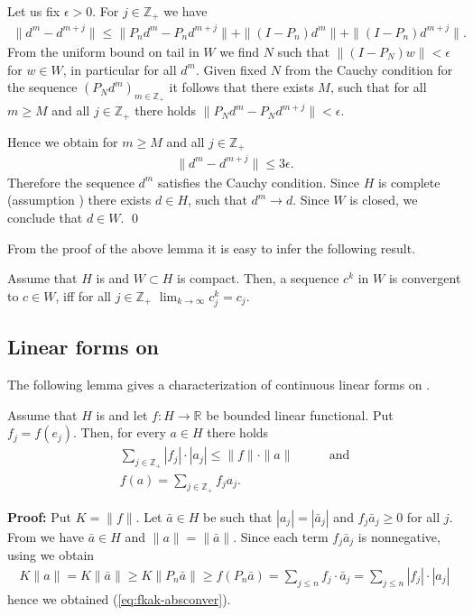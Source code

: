 Let us fix $\epsilon >0$. For $j\in{\mathbb Z_+}$ we have
\begin{eqnarray*}
  \|d^m - d^{m+j}\| \leq \|P_n d^m - P_n d^{m+j}\| + \|(I-P_n) d^m\| + \|(I-P_n) d^{m+j}\|.
\end{eqnarray*}
From the uniform bound on tail in $W$ we find $N$ such that $\|(I-P_N)w\| < \epsilon$ for $w \in W$, in particular for all $d^m$. Given fixed $N$ from the Cauchy condition for the sequence $(P_N d^m)_{m\in\mathbb Z_+}$ it follows that there exists $M$, such that for all $m \geq M$ and all $j \in \mathbb{Z}_+$ there holds $\|P_N d^m - P_N d^{m+j}\| < \epsilon$.

Hence we obtain for $m \geq M$ and all $j \in \mathbb{Z}_+$
 \begin{eqnarray*}
  \|d^m - d^{m+j}\| \leq 3 \epsilon.
\end{eqnarray*}
Therefore the sequence $d^m$ satisfies the Cauchy condition. Since $H$ is complete (assumption ) there exists $d \in H$, such that $d^m \to d$. Since $W$
is closed, we conclude that $d \in W$.
\qed

From the proof of the above lemma it is  easy to infer the following result.
\begin{lemma}
\label{lem:convW-gss}
  Assume that $H$ is \gss  and $W \subset H$ is compact. Then, a sequence $c^k$ in $W$ is convergent to $c \in W$, iff for all $j\in \mathbb{Z}_+$ $\lim_{k \to \infty} c^k_j=c_j$.
\end{lemma}

\subsection{Linear forms on \gss}

The following lemma gives a characterization of continuous linear forms on \gss.
\begin{lemma}
\label{lem:formOnH}
Assume that $H$ is \gss and let $f:H \to \mathbb{R}$ be bounded linear functional. Put $f_j=f(e_j)$. Then, for every $a \in H$ there holds
\begin{eqnarray}
   \sum_{j \in \mathbb{Z}_+} |f_j| \cdot  |a_j| \leq \|f\| \cdot \|a\|  \label{eq:fkak-absconver}&\qquad \text{and}\\
   f(a)=\sum_{j \in \mathbb{Z}_+} f_j a_j.   \label{eq:funcLinonH}
\end{eqnarray}
\end{lemma}
\textbf{Proof:} Put $K=\|f\|$.
   Let $\bar{a} \in H$ be such that $|a_j|=|\bar{a}_j|$ and $f_j \bar{a}_j \geq 0$ for all $j$. From  we have $\bar{a} \in H$ and $\|a\|=\|\bar{a}\|$.  Since each term $f_j \bar{a}_j$ is nonnegative, using  we obtain
\begin{eqnarray*}
 K\|a\| = K \|\bar{a}\| \geq   K \|P_n \bar{a}\|  \geq    f(P_n \bar{a}) =   \sum_{j \leq n}  f_j  \cdot  \bar{a}_j =  \sum_{j \leq n}  |f_j|  \cdot  |a_j|
\end{eqnarray*}
hence we obtained (\ref{eq:fkak-absconver}).

